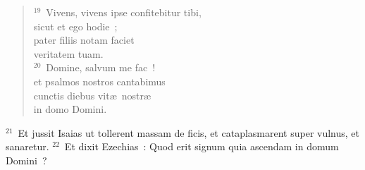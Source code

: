 \begin{flushleft}
\begin{verse}
${}^{19}$~Vivens, vivens ipse confitebitur tibi,\\ sicut et ego hodie~;\\ pater filiis notam faciet\\ veritatem tuam.\\
${}^{20}$~Domine, salvum me fac~!\\ et psalmos nostros cantabimus\\ cunctis diebus vit\ae\ nostr\ae \\ in domo Domini.\end{verse}\end{flushleft}


${}^{21}$~Et jussit Isaias ut tollerent massam de ficis, et cataplasmarent super vulnus, et sanaretur.
${}^{22}$~Et dixit Ezechias~: Quod erit signum quia ascendam in domum Domini~?

